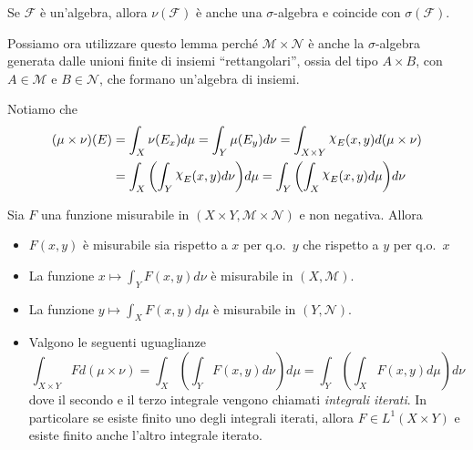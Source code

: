 \begin{lemma}
    Se \(\mathcal{F}\) è un'algebra, allora \(\nu(\mathcal{F})\) è anche una
    \(\sigma\)-algebra e coincide con \(\sigma(\mathcal{F})\).
\end{lemma}
Possiamo ora utilizzare questo lemma perché \(\mathcal{M} \times \mathcal{N}\) è
anche la \(\sigma\)-algebra generata dalle unioni finite di insiemi
``rettangolari'', ossia del tipo \(A \times B\), con \(A \in \mathcal{M}\) e \(B
\in \mathcal{N}\), che formano un'algebra di insiemi.

Notiamo che
\begin{align*}
    {\left( \mu \times \nu \right)} (E) &= \int_{X} \nu(E_x) d\mu = \int_{Y}
    \mu(E_y) d\nu = \int_{X \times Y} \rchi_{E}(x, y) d(\mu \times \nu) \\
        &= \int_X {\left( \int_Y \rchi_E(x, y) d\nu\right)} d\mu = \int_Y
        {\left( \int_X \rchi_E(x, y) d\mu\right)} d\nu
\end{align*}
\begin{theorem}[Tonelli]
    Sia \(F\) una funzione misurabile in \((X \times Y, \mathcal{M} \times
    \mathcal{N})\) e non negativa. Allora
    \begin{itemize}
        \item \(F(x, y)\) è misurabile sia rispetto a \(x\) per q.o.~\(y\) che
            rispetto a \(y\) per q.o.~\(x\)
        \item La funzione \(\displaystyle x \mapsto \int_Y F(x,y) d\nu\) è
            misurabile in \((X, \mathcal{M})\).
        \item La funzione \(\displaystyle y \mapsto \int_X F(x,y) d\mu\) è
            misurabile in \((Y, \mathcal{N})\).
        \item Valgono le seguenti uguaglianze
            \[
                \int_{X \times Y} F d(\mu \times \nu) = \int_X \left( \int_Y
                    F(x,y) d\nu \right) d\mu = \int_Y \left( \int_X F(x,y) d\mu
                        \right) d\nu
            \]
            dove il secondo e il terzo integrale vengono chiamati
            \emph{integrali iterati}. In particolare se esiste finito uno degli
            integrali iterati, allora \(F \in L^{1}(X \times Y)\) e esiste
            finito anche l'altro integrale iterato.
    \end{itemize}
\end{theorem}
